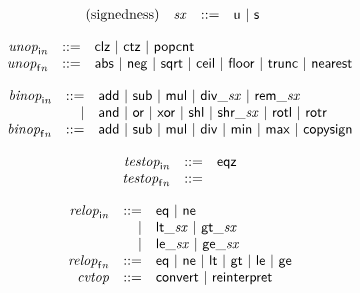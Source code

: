 $$
\begin{array}{@{}lrrl@{}l@{}}
\mbox{(signedness)} & {\mathit{sx}} &::=& \mathsf{u} ~|~ \mathsf{s} \\
\end{array}
$$

$$
\begin{array}{@{}lrrl@{}l@{}}
& {{\mathit{unop}}}_{{\mathsf{i}}{{\mathit{n}}}} &::=& \mathsf{clz} ~|~ \mathsf{ctz} ~|~ \mathsf{popcnt} \\
& {{\mathit{unop}}}_{{\mathsf{f}}{{\mathit{n}}}} &::=& \mathsf{abs} ~|~ \mathsf{neg} ~|~ \mathsf{sqrt} ~|~ \mathsf{ceil} ~|~ \mathsf{floor} ~|~ \mathsf{trunc} ~|~ \mathsf{nearest} \\
\end{array}
$$

$$
\begin{array}{@{}lrrl@{}l@{}}
& {{\mathit{binop}}}_{{\mathsf{i}}{{\mathit{n}}}} &::=& \mathsf{add} ~|~ \mathsf{sub} ~|~ \mathsf{mul} ~|~ {\mathsf{div\_}}{{\mathit{sx}}} ~|~ {\mathsf{rem\_}}{{\mathit{sx}}} \\ &&|&
\mathsf{and} ~|~ \mathsf{or} ~|~ \mathsf{xor} ~|~ \mathsf{shl} ~|~ {\mathsf{shr\_}}{{\mathit{sx}}} ~|~ \mathsf{rotl} ~|~ \mathsf{rotr} \\
& {{\mathit{binop}}}_{{\mathsf{f}}{{\mathit{n}}}} &::=& \mathsf{add} ~|~ \mathsf{sub} ~|~ \mathsf{mul} ~|~ \mathsf{div} ~|~ \mathsf{min} ~|~ \mathsf{max} ~|~ \mathsf{copysign} \\
\end{array}
$$

$$
\begin{array}{@{}lrrl@{}l@{}}
& {{\mathit{testop}}}_{{\mathsf{i}}{{\mathit{n}}}} &::=& \mathsf{eqz} \\
& {{\mathit{testop}}}_{{\mathsf{f}}{{\mathit{n}}}} &::=&  \\
\end{array}
$$

$$
\begin{array}{@{}lrrl@{}l@{}}
& {{\mathit{relop}}}_{{\mathsf{i}}{{\mathit{n}}}} &::=& \mathsf{eq} ~|~ \mathsf{ne} \\ &&|&
{\mathsf{lt\_}}{{\mathit{sx}}} ~|~ {\mathsf{gt\_}}{{\mathit{sx}}} \\ &&|&
{\mathsf{le\_}}{{\mathit{sx}}} ~|~ {\mathsf{ge\_}}{{\mathit{sx}}} \\
& {{\mathit{relop}}}_{{\mathsf{f}}{{\mathit{n}}}} &::=& \mathsf{eq} ~|~ \mathsf{ne} ~|~ \mathsf{lt} ~|~ \mathsf{gt} ~|~ \mathsf{le} ~|~ \mathsf{ge} \\
& {\mathit{cvtop}} &::=& \mathsf{convert} ~|~ \mathsf{reinterpret} \\
\end{array}
$$

